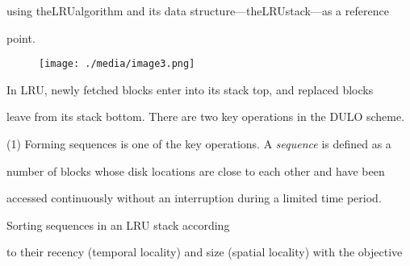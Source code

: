 \documentclass[12pt]{article}
\begin{document}
{\fontsize{10pt}{12.0pt}\selectfont using theLRUalgorithm and its data structure—theLRUstack—as a reference\par}\par

\setlength{\parskip}{8.04pt}
{\fontsize{10pt}{12.0pt}\selectfont point.\par}\par




\begin{figure}[H]
\advance\leftskip 4.97in		\texttt{[image: ./media/image3.png]}
\end{figure}



\setlength{\parskip}{0.0pt}
{\fontsize{10pt}{12.0pt}\selectfont In LRU, newly fetched blocks enter into its stack top, and replaced blocks\par}\par

{\fontsize{10pt}{12.0pt}\selectfont leave from its stack bottom. There are two key operations in the DULO scheme.\par}\par

{\fontsize{10pt}{12.0pt}\selectfont (1) Forming sequences is one of the key operations. A \textit{sequence }is defined as a\par}\par

{\fontsize{10pt}{12.0pt}\selectfont number of blocks whose disk locations are close to each other and have been\par}\par

\setlength{\parskip}{8.04pt}
{\fontsize{10pt}{12.0pt}\selectfont accessed continuously without an interruption during a limited time period.\par}\par


\vspace{\baselineskip}
\setlength{\parskip}{0.0pt}
{\fontsize{10pt}{12.0pt} Sorting sequences in an LRU stack according\par}\par

{\fontsize{10pt}{12.0pt}\selectfont to their recency (temporal locality) and size (spatial locality) with the objective\par}\par
\end{document}
